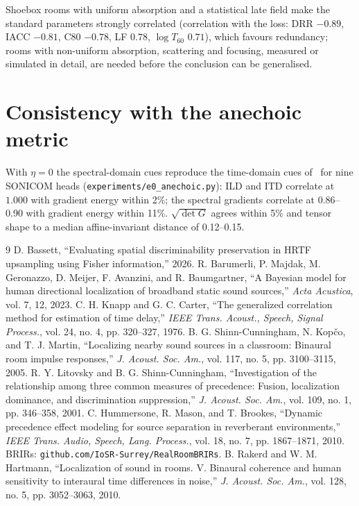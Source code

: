 \documentclass[10pt]{article}
\theoremstyle{definition}
\begin{document}
Shoebox rooms with uniform absorption and a statistical late field make the standard parameters strongly correlated (correlation with the loss: DRR $-0.89$, IACC $-0.81$, C80 $-0.78$, LF $0.78$, $\log T_{60}$ $0.71$), which favours redundancy; rooms with non-uniform absorption, scattering and focusing, measured or simulated in detail, are needed before the conclusion can be generalised.

\section{Consistency with the anechoic metric}\label{sec:check}
With $\eta=0$ the spectral-domain cues reproduce the time-domain cues of~\cite{bassett2026} for nine SONICOM heads (\texttt{experiments/e0\_anechoic.py}): ILD and ITD correlate at $1.000$ with gradient energy within 2\%; the spectral gradients correlate at 0.86--0.90 with gradient energy within 11\%. $\sqrt{\det G}$ agrees within 5\% and tensor shape to a median affine-invariant distance of 0.12--0.15.

\begin{thebibliography}{9}
 D. Bassett, ``Evaluating spatial discriminability preservation in HRTF upsampling using Fisher information,'' 2026.
 R. Barumerli, P. Majdak, M. Geronazzo, D. Meijer, F. Avanzini, and R. Baumgartner, ``A Bayesian model for human directional localization of broadband static sound sources,'' \emph{Acta Acustica}, vol. 7, 12, 2023.
 C. H. Knapp and G. C. Carter, ``The generalized correlation method for estimation of time delay,'' \emph{IEEE Trans. Acoust., Speech, Signal Process.}, vol. 24, no. 4, pp. 320--327, 1976.
 B. G. Shinn-Cunningham, N. Kopčo, and T. J. Martin, ``Localizing nearby sound sources in a classroom: Binaural room impulse responses,'' \emph{J. Acoust. Soc. Am.}, vol. 117, no. 5, pp. 3100--3115, 2005.
 R. Y. Litovsky and B. G. Shinn-Cunningham, ``Investigation of the relationship among three common measures of precedence: Fusion, localization dominance, and discrimination suppression,'' \emph{J. Acoust. Soc. Am.}, vol. 109, no. 1, pp. 346--358, 2001.
 C. Hummersone, R. Mason, and T. Brookes, ``Dynamic precedence effect modeling for source separation in reverberant environments,'' \emph{IEEE Trans. Audio, Speech, Lang. Process.}, vol. 18, no. 7, pp. 1867--1871, 2010. BRIRs: \texttt{github.com/IoSR-Surrey/RealRoomBRIRs}.
 B. Rakerd and W. M. Hartmann, ``Localization of sound in rooms. V. Binaural coherence and human sensitivity to interaural time differences in noise,'' \emph{J. Acoust. Soc. Am.}, vol. 128, no. 5, pp. 3052--3063, 2010.
\end{thebibliography}
\end{document}
